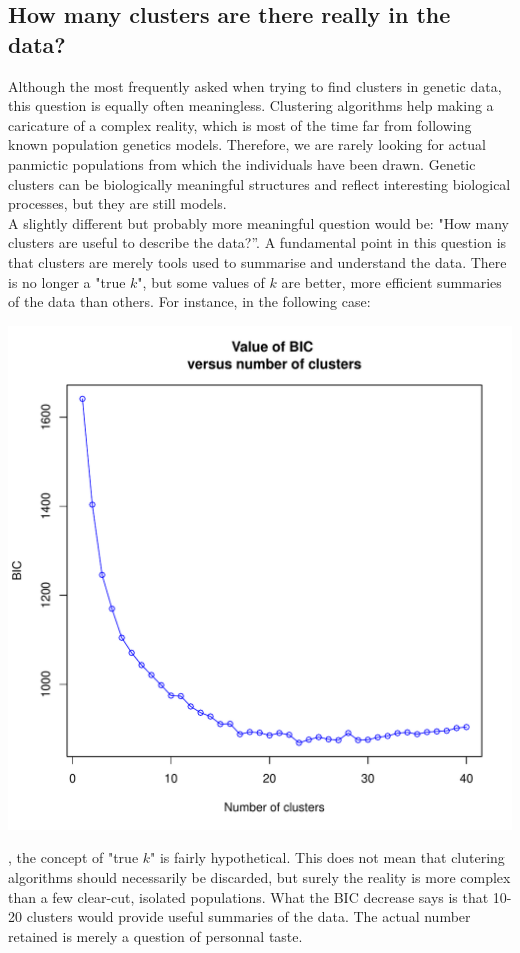 \documentclass{article}
\begin{document}
\subsection{How many clusters are there really in the data?}

Although the most frequently asked when trying to find clusters in genetic data, this question is
equally often meaningless. Clustering algorithms help making a caricature of a complex reality,
which is most of the time far from following known population genetics models. Therefore, we are
rarely looking for actual panmictic populations from which the individuals have been drawn. Genetic
clusters can be biologically meaningful structures and reflect interesting biological processes, but
they are still models.
\\

A slightly different but probably more meaningful question would be: "How many clusters are useful to
describe the data?''. A fundamental point in this question is that clusters are merely tools used to
summarise and understand the data. There is no longer a "true $k$", but some values of $k$ are
better, more efficient summaries of the data than others.
For instance, in the following case:
\begin{center}
  \includegraphics[width=.7\textwidth]{figs/findclust-noclearcut.pdf}
\end{center}

\noindent , the concept of "true $k$" is fairly hypothetical. This does not mean that clutering
algorithms should necessarily be discarded, but surely the reality is more complex than a few
clear-cut, isolated populations. What the BIC decrease says is that 10-20 clusters would provide useful
summaries of the data. The actual number retained is merely a question of personnal taste.
\end{document}
